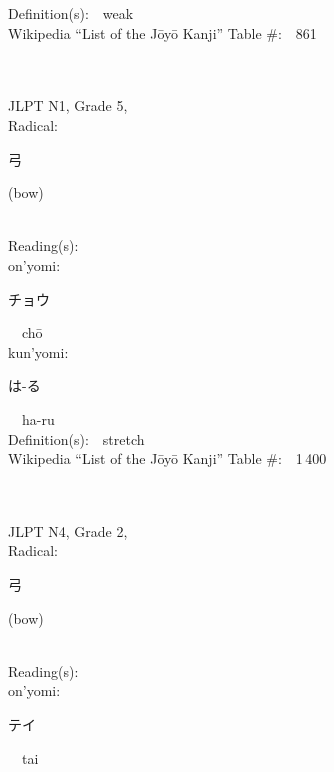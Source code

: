 \begin{multicols}{2}
Definition(s):\ \ weak \\
Wikipedia ``List of the J\=oy\=o Kanji'' Table \#:\ \ 861 \\
\ \ \\
{\fontsize{34pt}{40pt}  }\ \ \\  %
{JLPT N1, Grade 5, \\Radical:\ \ {\begin{CJK}{UTF8}{min} 弓 \end{CJK}} (bow) } \\
Reading(s):\ \ \\
{\hspace*{1em}}on'yomi:\ \ \\
{\hspace*{2em}}{\begin{CJK}{UTF8}{min} チョウ \end{CJK}}\ \ ch\=o\ \ \\
{\hspace*{1em}}kun'yomi:\ \ \\
{\hspace*{2em}}{\begin{CJK}{UTF8}{min} は-る \end{CJK}}\ \ ha-ru\ \ \\
Definition(s):\ \ stretch \\
Wikipedia ``List of the J\=oy\=o Kanji'' Table \#:\ \ 1\,400 \\
\ \ \\
{\fontsize{34pt}{40pt}  }\ \ \\  %
{JLPT N4, Grade 2, \\Radical:\ \ {\begin{CJK}{UTF8}{min} 弓 \end{CJK}} (bow) } \\
Reading(s):\ \ \\
{\hspace*{1em}}on'yomi:\ \ \\
{\hspace*{2em}}{\begin{CJK}{UTF8}{min} テイ \end{CJK}}\ \ tai\ \ \\

\end{multicols}
